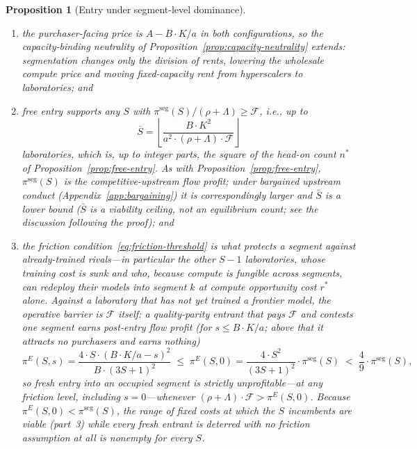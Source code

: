 \documentclass[11pt]{article}
\newtheorem{proposition}{Proposition}
\begin{document}
\begin{proposition}[Entry under segment-level dominance]
\begin{enumerate}
\begin{equation}\pi^{\mathrm{seg}}(S)=\frac{B\cdot K^{2}}{a^{2}\cdot S},\end{equation}
which is $S$ times what each of the same $S$ laboratories would earn competing head-on for the whole market;
\item the purchaser-facing price is $A-B\cdot K/a$ in both configurations, so the capacity-binding neutrality of Proposition~\ref{prop:capacity-neutrality} extends: segmentation changes only the division of rents, lowering the wholesale compute price and moving fixed-capacity rent from hyperscalers to laboratories; and
\item free entry supports any $S$ with $\pi^{\mathrm{seg}}(S)/(\rho+\Lambda)\geq\mathcal F$, i.e., up to
\begin{equation}\bar S=\left\lfloor\frac{B\cdot K^{2}}{a^{2}\cdot(\rho+\Lambda)\cdot\mathcal F}\right\rfloor\end{equation}
laboratories, which is, up to integer parts, the \emph{square} of the head-on count $n^{*}$ of Proposition~\ref{prop:free-entry}. As with Proposition~\ref{prop:free-entry}, $\pi^{\mathrm{seg}}(S)$ is the competitive-upstream flow profit; under bargained upstream conduct (Appendix~\ref{app:bargaining}) it is correspondingly larger and $\bar S$ is a lower bound ($\bar S$ is a viability ceiling, not an equilibrium count; see the discussion following the proof); and
\item the friction condition~\eqref{eq:friction-threshold} is what protects a segment against \emph{already-trained} rivals---in particular the other $S-1$ laboratories, whose training cost is sunk and who, because compute is fungible across segments, can redeploy their models into segment $k$ at compute opportunity cost $r^{*}$ alone. Against a laboratory that has \emph{not yet} trained a frontier model, the operative barrier is $\mathcal F$ itself: a quality-parity entrant that pays $\mathcal F$ and contests one segment earns post-entry flow profit (for $s\leq B\cdot K/a$; above that it attracts no purchasers and earns nothing)
\begin{equation}\label{eq:entrant-duopoly-profit}\pi^{E}(S,s)=\frac{4\cdot S\cdot\left(B\cdot K/a-s\right)^{2}}{B\cdot(3S+1)^{2}}\;\leq\;\pi^{E}(S,0)=\frac{4\cdot S^{2}}{(3S+1)^{2}}\cdot\pi^{\mathrm{seg}}(S)\;<\;\frac{4}{9}\cdot\pi^{\mathrm{seg}}(S),\end{equation}
so fresh entry into an occupied segment is strictly unprofitable---at \emph{any} friction level, including $s=0$---whenever $(\rho+\Lambda)\cdot\mathcal F>\pi^{E}(S,0)$. Because $\pi^{E}(S,0)<\pi^{\mathrm{seg}}(S)$, the range of fixed costs at which the $S$ incumbents are viable (part~3) while every fresh entrant is deterred with no friction assumption at all is nonempty for every $S$.
\end{enumerate}
\end{proposition}
\end{document}
